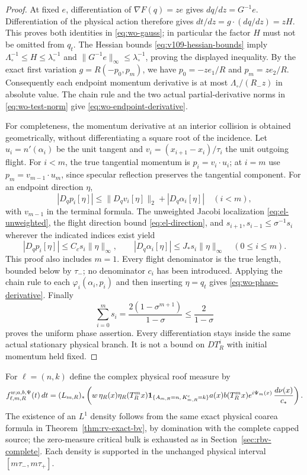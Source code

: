 \begin{proof}
At fixed $e$, differentiation of $\nabla F(q)=ze$ gives
$dq/dz=G^{-1}e$.  Differentiation of the physical action therefore
gives $dt/dz=g\cdot(dq/dz)=zH$.  This proves both identities in
\eqref{eq:wo-gauss}; in particular the factor $H$ must not be
omitted from $q_t$.  The Hessian bounds
\eqref{eq:v109-hessian-bounds} imply
$\Lambda_\circ^{-1}\le H\le\lambda_\circ^{-1}$ and
$\|G^{-1}e\|_\infty\le\lambda_\circ^{-1}$, proving the displayed
inequality.  By the exact first variation
$g=R(-p_0,p_m)$, we have $p_0=-ze_1/R$ and $p_m=ze_2/R$.
Consequently each endpoint momentum derivative is at most
$\Lambda_\circ/(R_-z)$ in absolute value.  The chain rule and the
two actual partial-derivative norms in \eqref{eq:wo-test-norm}
give \eqref{eq:wo-endpoint-derivative}.

For completeness, the momentum derivative at an interior collision
is obtained geometrically, without differentiating a square root
of the incidence.  Let $u_i=n'(\alpha_i)$ be the unit tangent and
$v_i=(x_{i+1}-x_i)/\tau_i$ the unit outgoing flight.  For $i<m$,
the true tangential momentum is $p_i=v_i\cdot u_i$; at $i=m$
use $p_m=v_{m-1}\cdot u_m$, since specular reflection preserves
the tangential component.  For an endpoint direction $\eta$,
\[
 |D_qp_i[\eta]|
 \le \|D_qv_i[\eta]\|_2+|D_q\alpha_i[\eta]|
 \quad(i<m),
\]
with $v_{m-1}$ in the terminal formula.  The unweighted Jacobi
localization \eqref{eq:el-unweighted}, the flight direction bound
\eqref{eq:el-direction}, and
$s_{i+1},s_{i-1}\le\sigma^{-1}s_i$ wherever the indicated
indices exist yield
\begin{equation}\label{eq:wo-interior-momentum}
 |D_qp_i[\eta]|\le C_c s_i\|\eta\|_\infty,
 \qquad |D_q\alpha_i[\eta]|\le J_*s_i\|\eta\|_\infty
 \quad(0\le i\le m).
\end{equation}
This proof also includes $m=1$.  Every flight denominator is the
true length, bounded below by $\tau_-$; no denominator $c_i$
has been introduced.  Applying the chain rule to each
$\varphi_i(\alpha_i,p_i)$ and then inserting $\eta=q_t$ gives
\eqref{eq:wo-phase-derivative}.  Finally
\[
 \sum_{i=0}^m s_i
 =\frac{2(1-\sigma^{m+1})}{1-\sigma}
 \le\frac2{1-\sigma}
\]
proves the uniform phase assertion.  Every differentiation stays
inside the same actual stationary physical branch.  It is not a
bound on $D T_R^i$ with initial momentum held fixed.
\end{proof}

For $\ell=(n,k)$ define the complex physical roof measure by
\begin{equation}\label{eq:wo-measures}
 f^{w;a,b,\Psi}_{\ell,m,R}(t)\,dt
 =(L_{m,R})_*\left(
 w\,\eta_R(x)\eta_R(T_R^mx)
 \mathbf1_{\{A_{m,R}=n,\,K^{\rm c}_{m,R}=k\}}
 a(x)b(T_R^mx)e^{i\Psi_m(x)}\,\frac{d\nu(x)}{c_*}
 \right).
\end{equation}
The existence of an $L^1$ density follows from the same exact
physical coarea formula in Theorem~\ref{thm:rv-exact-bv}, by domination with the complete
capped source; the zero-measure critical bulk is exhausted as in Section~\ref{sec:rbv-complete}.
Each density is supported in the unchanged physical interval
$[m\tau_-,m\tau_+]$.

